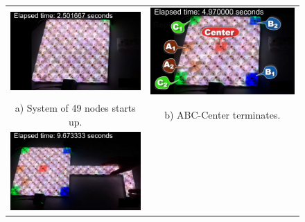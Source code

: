 {
	\newcommand{\subFigureWidth}{0.425\linewidth}
	\begin{figure}[h!]
		\centering			
		\small
		\begin{tabular}{c c}
			\includegraphics[width=\subFigureWidth]{images/centrality/abc-centerv1-dynamics/0}  &
			\includegraphics[width=\subFigureWidth]{images/centrality/abc-centerv1-dynamics/1}\\
			a) System of 49 nodes starts up. & b) ABC-Center terminates.\\
			\includegraphics[width=\subFigureWidth]{images/centrality/abc-centerv1-dynamics/2} &

\end{tabular}
\end{figure}}
